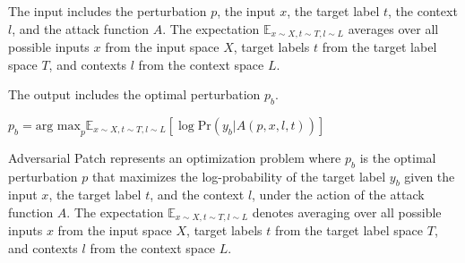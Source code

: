 The input includes the perturbation $p$, the input $x$, the target label $t$, the context $l$, and the attack function $A$. The expectation $\mathbb{E}_{x \sim X, t \sim T, l \sim L}$ averages over all possible inputs $x$ from the input space $X$, target labels $t$ from the target label space $T$, and contexts $l$ from the context space $L$.

The output includes the optimal perturbation $p_b$.

$p_b = \text{arg max}_p \mathbb{E}_{x \sim X, t \sim T, l \sim L} [\log \text{Pr}(y_b | A(p, x, l, t))]$

Adversarial Patch represents an optimization problem where $p_b$ is the optimal perturbation $p$ that maximizes the log-probability of the target label $y_b$ given the input $x$, the target label $t$, and the context $l$, under the action of the attack function $A$. The expectation $\mathbb{E}_{x \sim X, t \sim T, l \sim L}$ denotes averaging over all possible inputs $x$ from the input space $X$, target labels $t$ from the target label space $T$, and contexts $l$ from the context space $L$.
